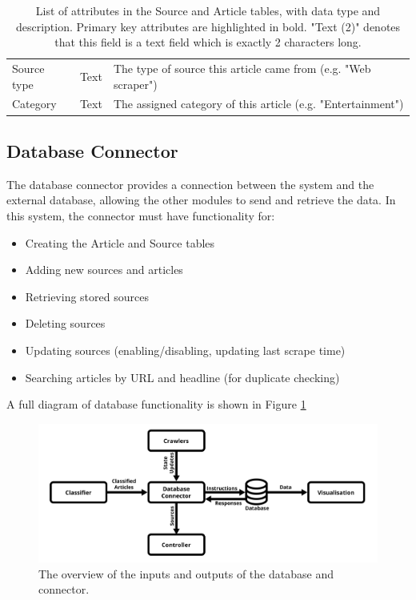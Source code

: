 \documentclass{l4proj}
\begin{document}
\begin{table}[h]
\begin{tabular}{lll}
Source type        & Text          & The type of source this article came from (e.g. "Web scraper")                                                                      \\
Category           & Text          & The assigned category of this article (e.g. "Entertainment")                                                                        \\ \hline
\end{tabular}
\caption{List of attributes in the Source and Article tables, with data type and description. Primary key attributes are highlighted in bold. "Text (2)" denotes that this field is a text field which is exactly 2 characters long.}
\label{table:schema}
\end{table}

\subsection{Database Connector}
The database connector provides a connection between the system and the external database, allowing the other modules to send and retrieve the data. In this system, the connector must have functionality for:
\begin{itemize}
    \item Creating the Article and Source tables
    \item Adding new sources and articles
    \item Retrieving stored sources
    \item Deleting sources
    \item Updating sources (enabling/disabling, updating last scrape time)
    \item Searching articles by URL and headline (for duplicate checking) 
\end{itemize}
A full diagram of database functionality is shown in Figure \ref{fig:database_diagram}
 \begin{figure}[h]
\centering
\includegraphics[width=\textwidth]{images/Database-diagram.png}
\caption{The overview of the inputs and outputs of the database and connector.}
\label{fig:database_diagram}
\end{figure}
\end{document}
